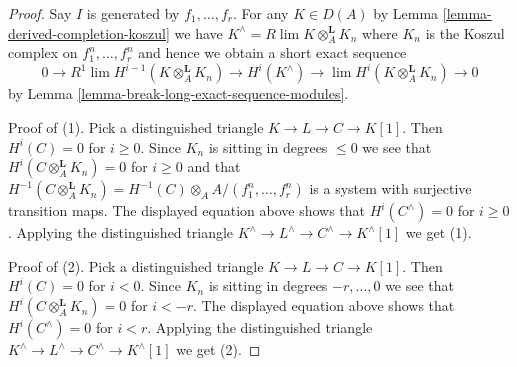 \documentclass[10pt,a4paper]{amsart}
\theoremstyle{plain}
\theoremstyle{definition}
\theoremstyle{remark}
\numberwithin{equation}{subsection}
\def\lim{\mathop{\mathrm{lim}}\nolimits}
\begin{document}
\begin{proof}
Say $I$ is generated by $f_1, \ldots, f_r$. For any $K \in D(A)$
by Lemma \ref{lemma-derived-completion-koszul} we have
$K^\wedge = R\lim K \otimes_A^\mathbf{L} K_n$ where $K_n$
is the Koszul complex on $f_1^n, \ldots, f_r^n$
and hence we obtain a short exact sequence
$$
0 \to R^1\lim H^{i - 1}(K \otimes_A^\mathbf{L} K_n)
\to H^i(K^\wedge) \to \lim H^i(K \otimes_A^\mathbf{L} K_n) \to 0
$$
by Lemma \ref{lemma-break-long-exact-sequence-modules}.

\medskip\noindent
Proof of (1). Pick a distinguished triangle $K \to L \to C \to K[1]$.
Then $H^i(C) = 0$ for $i \geq 0$. Since $K_n$ is sitting in degrees $\leq 0$
we see that $H^i(C \otimes_A^\mathbf{L} K_n) = 0$ for $i \geq 0$
and that $H^{-1}(C \otimes_A^\mathbf{L} K_n) =
H^{-1}(C) \otimes_A A/(f_1^n, \ldots, f_r^n)$ is a system with
surjective transition maps. The displayed equation above shows
that $H^i(C^\wedge) = 0$ for $i \geq 0$. Applying the distinguished triangle
$K^\wedge \to L^\wedge \to C^\wedge \to K^\wedge[1]$ we get (1).

\medskip\noindent
Proof of (2). Pick a distinguished triangle $K \to L \to C \to K[1]$.
Then $H^i(C) = 0$ for $i < 0$. Since $K_n$ is sitting in degrees
$-r, \ldots, 0$ we see that $H^i(C \otimes_A^\mathbf{L} K_n) = 0$
for $i < -r$. The displayed equation above shows
that $H^i(C^\wedge) = 0$ for $i < r$. Applying the distinguished triangle
$K^\wedge \to L^\wedge \to C^\wedge \to K^\wedge[1]$ we get (2).
\end{proof}
\end{document}
